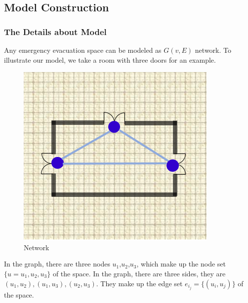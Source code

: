  

\subsection{Model Construction}
\subsubsection{The Details about Model}

Any emergency evacuation space can be modeled as $G(v,E)$ network.
To illustrate our model, we take a room with three doors for an example.
\begin{figure}[ht]
    \centering
    \includegraphics[scale=0.6]{room.png}
    \caption{Network}
    \label{1}
\end{figure}

In the graph, there are three nodes $u_1$,$u_2$,$u_3$, which make up the node set $\{u={u_1, u_2, u_3} \}$ of the space. In the graph, there are three sides, they are $ (u_1, u_2), (u_1, u_3), (u_2, u_3)$. They make up the edge set
$e_i_j=\{(u_i, u_j)\}$ of the space.

